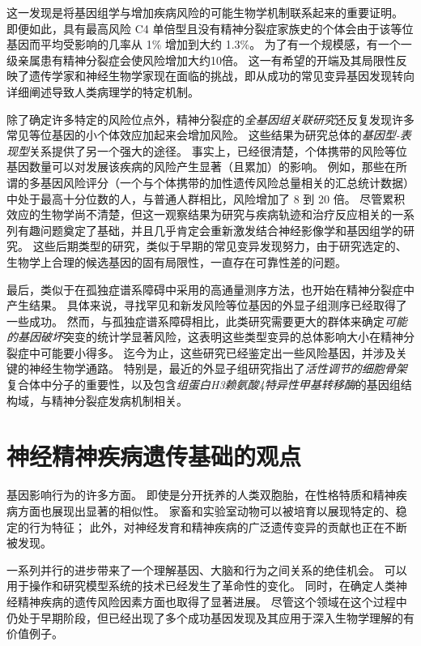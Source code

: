 这一发现是将基因组学与增加疾病风险的可能生物学机制联系起来的重要证明。
即便如此，具有最高风险 C4 单倍型且没有精神分裂症家族史的个体会由于该等位基因而平均受影响的几率从 1\% 增加到大约 1.3\%。
为了有一个规模感，有一个一级亲属患有精神分裂症会使风险增加大约10倍。
这一有希望的开端及其局限性反映了遗传学家和神经生物学家现在面临的挑战，即从成功的常见变异基因发现转向详细阐述导致人类病理学的特定机制。


除了确定许多特定的风险位点外，精神分裂症的\textit{全基因组关联研究}还反复发现许多常见等位基因的小个体效应加起来会增加风险。
这些结果为研究总体的\textit{基因型-表现型}关系提供了另一个强大的途径。
事实上，已经很清楚，个体携带的风险等位基因数量可以对发展该疾病的风险产生显著（且累加）的影响。
例如，那些在所谓的多基因风险评分（一个与个体携带的加性遗传风险总量相关的汇总统计数据）中处于最高十分位数的人，与普通人群相比，风险增加了 8 到 20 倍。
尽管累积效应的生物学尚不清楚，但这一观察结果为研究与疾病轨迹和治疗反应相关的一系列有趣问题奠定了基础，并且几乎肯定会重新激发结合神经影像学和基因组学的研究。
这些后期类型的研究，类似于早期的常见变异发现努力，由于研究选定的、生物学上合理的候选基因的固有局限性，一直存在可靠性差的问题。


最后，类似于在孤独症谱系障碍中采用的高通量测序方法，也开始在精神分裂症中产生结果。
具体来说，寻找罕见和新发风险等位基因的外显子组测序已经取得了一些成功。
然而，与孤独症谱系障碍相比，此类研究需要更大的群体来确定\textit{可能的基因破坏}突变的统计学显著风险，这表明这些类型变异的总体影响大小在精神分裂症中可能要小得多。
迄今为止，这些研究已经鉴定出一些风险基因，并涉及关键的神经生物学通路。
特别是，最近的外显子组研究指出了\textit{活性调节的细胞骨架}复合体中分子的重要性，以及包含\textit{组蛋白H3赖氨酸4特异性甲基转移酶}的基因组结构域，与精神分裂症发病机制相关。


\section{神经精神疾病遗传基础的观点}

基因影响行为的许多方面。
即使是分开抚养的人类双胞胎，在性格特质和精神疾病方面也展现出显著的相似性。
家畜和实验室动物可以被培育以展现特定的、稳定的行为特征；
此外，对神经发育和精神疾病的广泛遗传变异的贡献也正在不断被发现。


一系列并行的进步带来了一个理解基因、大脑和行为之间关系的绝佳机会。
可以用于操作和研究模型系统的技术已经发生了革命性的变化。
同时，在确定人类神经精神疾病的遗传风险因素方面也取得了显著进展。
尽管这个领域在这个过程中仍处于早期阶段，但已经出现了多个成功基因发现及其应用于深入生物学理解的有价值例子。


